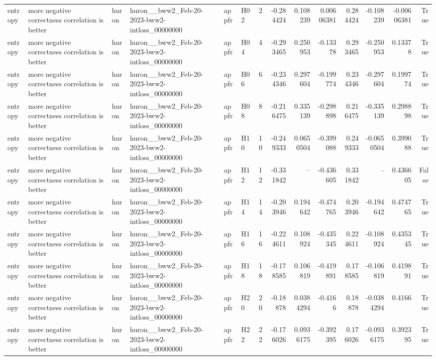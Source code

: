 \begin{longtable}{llllllrrrrrrrr}
entropy & more negative correctness correlation is better & huron & huron\_\_bww2\_Feb-20-2023-bww2-intloss\_00000000 & appfr & H02 & 2 & -0.284424 & 0.108239 & 0.00606381 & 0.284424 & -0.108239 & -0.00606381 & True \\
entropy & more negative correctness correlation is better & huron & huron\_\_bww2\_Feb-20-2023-bww2-intloss\_00000000 & appfr & H04 & 4 & -0.293465 & 0.250953 & -0.13378 & 0.293465 & -0.250953 & 0.13378 & True \\
entropy & more negative correctness correlation is better & huron & huron\_\_bww2\_Feb-20-2023-bww2-intloss\_00000000 & appfr & H06 & 6 & -0.234346 & 0.297604 & -0.199774 & 0.234346 & -0.297604 & 0.199774 & True \\
entropy & more negative correctness correlation is better & huron & huron\_\_bww2\_Feb-20-2023-bww2-intloss\_00000000 & appfr & H08 & 8 & -0.216475 & 0.335139 & -0.298898 & 0.216475 & -0.335139 & 0.298898 & True \\
entropy & more negative correctness correlation is better & huron & huron\_\_bww2\_Feb-20-2023-bww2-intloss\_00000000 & appfr & H10 & 10 & -0.249333 & 0.0650504 & -0.399088 & 0.249333 & -0.0650504 & 0.399088 & True \\
entropy & more negative correctness correlation is better & huron & huron\_\_bww2\_Feb-20-2023-bww2-intloss\_00000000 & appfr & H12 & 12 & -0.331842 & -- & -0.436605 & 0.331842 & -- & 0.436605 & False \\
entropy & more negative correctness correlation is better & huron & huron\_\_bww2\_Feb-20-2023-bww2-intloss\_00000000 & appfr & H14 & 14 & -0.203946 & 0.194642 & -0.474765 & 0.203946 & -0.194642 & 0.474765 & True \\
entropy & more negative correctness correlation is better & huron & huron\_\_bww2\_Feb-20-2023-bww2-intloss\_00000000 & appfr & H16 & 16 & -0.224611 & 0.108924 & -0.435345 & 0.224611 & -0.108924 & 0.435345 & True \\
entropy & more negative correctness correlation is better & huron & huron\_\_bww2\_Feb-20-2023-bww2-intloss\_00000000 & appfr & H18 & 18 & -0.178585 & 0.106819 & -0.419891 & 0.178585 & -0.106819 & 0.419891 & True \\
entropy & more negative correctness correlation is better & huron & huron\_\_bww2\_Feb-20-2023-bww2-intloss\_00000000 & appfr & H20 & 20 & -0.18878 & 0.0384294 & -0.4166 & 0.18878 & -0.0384294 & 0.4166 & True \\
entropy & more negative correctness correlation is better & huron & huron\_\_bww2\_Feb-20-2023-bww2-intloss\_00000000 & appfr & H22 & 22 & -0.176026 & 0.0936175 & -0.392395 & 0.176026 & -0.0936175 & 0.392395 & True \\

\end{longtable}
